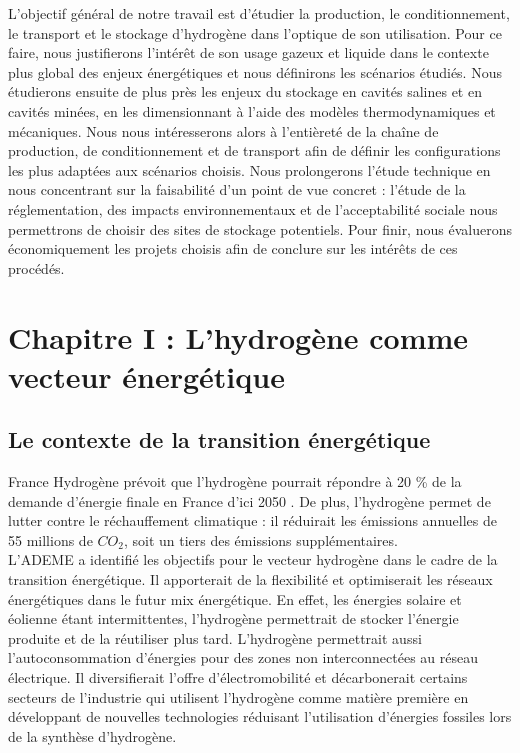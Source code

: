 \documentclass[11pt,french,a4paper]{article}
\begin{document}
L’objectif général de notre travail est d’étudier la production, le conditionnement, le transport et le stockage d’hydrogène dans l’optique de son utilisation. Pour ce faire, nous justifierons l’intérêt de son usage gazeux et liquide dans le contexte plus global des enjeux énergétiques et nous définirons les scénarios étudiés. Nous étudierons ensuite de plus près les enjeux du stockage en cavités salines et en cavités minées, en les dimensionnant à l’aide des modèles thermodynamiques et mécaniques. Nous nous intéresserons alors à l’entièreté de la chaîne de production, de conditionnement et de transport afin de définir les configurations les plus adaptées aux scénarios choisis. Nous prolongerons l’étude technique en nous concentrant sur la faisabilité d’un point de vue concret : l’étude de la réglementation, des impacts environnementaux et de l’acceptabilité sociale nous permettrons de choisir des sites de stockage potentiels. Pour finir, nous évaluerons économiquement les projets choisis afin de conclure sur les intérêts de ces procédés. 









\section{Chapitre I : L'hydrogène comme vecteur énergétique}

\subsection{Le  contexte de la transition énergétique}
France Hydrogène prévoit que l'hydrogène pourrait répondre à 20 \% de la demande d’énergie finale en France d’ici 2050  \cite{InternationalEnergyAgency_2021}. De plus, l’hydrogène permet de lutter contre le réchauffement climatique : il réduirait les émissions annuelles de 55 millions de $CO_2$,  soit un tiers des émissions supplémentaires. \\

L’ADEME a identifié les objectifs pour le vecteur hydrogène dans le cadre de la transition énergétique. Il apporterait de la flexibilité et optimiserait les réseaux énergétiques dans le futur mix énergétique. En effet, les énergies solaire et éolienne étant intermittentes, l’hydrogène permettrait de stocker l’énergie produite et de la réutiliser plus tard. L’hydrogène permettrait aussi l’autoconsommation d’énergies pour des zones non interconnectées au réseau électrique. Il diversifierait l’offre d’électromobilité et décarbonerait certains secteurs de l’industrie qui utilisent l’hydrogène comme matière première en développant de nouvelles technologies réduisant l’utilisation d’énergies fossiles lors de la synthèse d’hydrogène.
\end{document}
